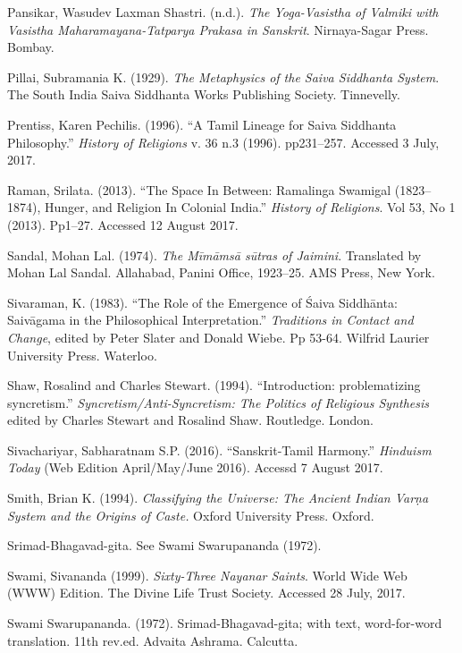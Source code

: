 \begin{thebibliography}{99}
  Pansikar, Wasudev Laxman Shastri. (n.d.). \textit{The Yoga-Vasistha of Valmiki with Vasistha Maharamayana-Tatparya Prakasa in Sanskrit}. Nirnaya-Sagar Press. Bombay.

  Pillai, Subramania K. (1929). \textit{The Metaphysics of the Saiva Siddhanta System}. The South India Saiva Siddhanta Works Publishing Society. Tinnevelly.

  Prentiss, Karen Pechilis. (1996). “A Tamil Lineage for Saiva Siddhanta Philosophy.” \textit{History of Religions} v. 36 n.3 (1996). pp231–257. Accessed 3 July, 2017.

  Raman, Srilata. (2013). “The Space In Between: Ramalinga Swamigal (1823–1874), Hunger, and Religion In Colonial India.” \textit{History of Religions}. Vol 53, No 1 (2013). Pp1–27. Accessed 12 August 2017.

  Sandal, Mohan Lal. (1974). \textit{The Mīmāmsā sūtras of Jaimini}. Translated by Mohan Lal Sandal. Allahabad, Panini Office, 1923–25. AMS Press, New York.

  Sivaraman, K. (1983). “The Role of the Emergence of Śaiva Siddhānta: Saivāgama in the Philosophical Interpretation.” \textit{Traditions in Contact and Change}, edited by Peter Slater and Donald Wiebe. Pp 53-64. Wilfrid Laurier University Press. Waterloo.

  Shaw, Rosalind and Charles Stewart. (1994). “Introduction: problematizing syncretism.” \textit{Syncretism/Anti-Syncretism: The Politics of Religious Synthesis} edited by Charles Stewart and Rosalind Shaw. Routledge. London.

  Sivachariyar, Sabharatnam S.P. (2016). “Sanskrit-Tamil Harmony.” \textit{Hinduism Today} (Web Edition April/May/June 2016). Accessd 7 August 2017.

  Smith, Brian K. (1994). \textit{Classifying the Universe: The Ancient Indian Varṇa System and the Origins of Caste.} Oxford University Press. Oxford.

  Srimad-Bhagavad-gita. See Swami Swarupananda (1972).

  Swami, Sivananda (1999). \textit{Sixty-Three Nayanar Saints}. World Wide Web (WWW) Edition. The Divine Life Trust Society. Accessed 28 July, 2017.

  Swami Swarupananda. (1972). Srimad-Bhagavad-gita; with text, word-for-word translation. 11th rev.ed. Advaita Ashrama. Calcutta.


\end{thebibliography}
